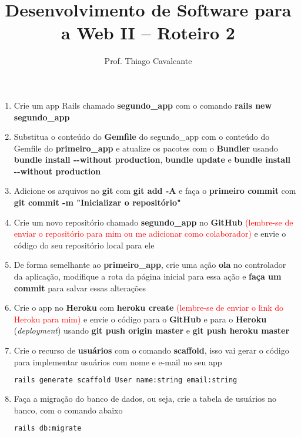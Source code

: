 \documentclass[a4paper,12pt]{article}
\title{Desenvolvimento de Software para a Web II -- Roteiro 2}
\author{Prof. Thiago Cavalcante}
\date{}
\begin{document}
\maketitle

\sloppy
\raggedright

\begin{enumerate}
  \item Crie um app Rails chamado \textbf{segundo\_app} com o comando \textbf{rails new segundo\_app}
  \item Substitua o conteúdo do \textbf{Gemfile} do segundo\_app com o conteúdo do Gemfile do \textbf{primeiro\_app} e atualize os pacotes com o \textbf{Bundler} usando \textbf{bundle install {-}-without production}, \textbf{bundle update} e \textbf{bundle install {-}-without production}
  \item Adicione os arquivos no \textbf{git} com \textbf{git add -A} e faça o \textbf{primeiro commit} com \textbf{git commit -m "Inicializar o repositório"}
  \item Crie um novo repositório chamado \textbf{segundo\_app} no \textbf{GitHub} \textcolor{red}{(lembre-se de enviar o repositório para mim ou me adicionar como colaborador)} e envie o código do seu repositório local para ele
  \item De forma semelhante ao \textbf{primeiro\_app}, crie uma ação \textbf{ola} no controlador da aplicação, modifique a rota da página inicial para essa ação e \textbf{faça um commit} para salvar essas alterações
  \item Crie o app no \textbf{Heroku} com \textbf{heroku create} \textcolor{red}{(lembre-se de enviar o link do Heroku para mim)} e envie o código para o \textbf{GitHub} e para o \textbf{Heroku} (\textit{deployment}) usando \textbf{git push origin master} e \textbf{git push heroku master}
  \item Crie o recurso de \textbf{usuários} com o comando \textbf{scaffold}, isso vai gerar o código para implementar usuários com nome e e-mail no seu app

    \begin{lstlisting}[language=Bash, basicstyle=\fontsize{9.8}{12}\selectfont\ttfamily]
rails generate scaffold User name:string email:string
    \end{lstlisting}

  \item Faça a migração do banco de dados, ou seja, crie a tabela de usuários no banco, com o comando abaixo

    \begin{lstlisting}[language=Bash]
rails db:migrate
    \end{lstlisting}


\end{enumerate}
\end{document}
